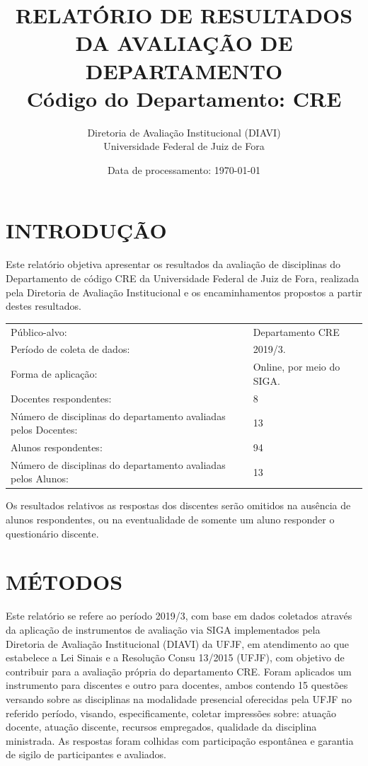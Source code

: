 \documentclass[a4paper,10pt]{article}
\date{Data de processamento: \today}
\begin{document}
\author{Diretoria de Avaliação Institucional (DIAVI) \\ Universidade Federal de Juiz de Fora}

\title{RELATÓRIO DE RESULTADOS DA AVALIAÇÃO DE DEPARTAMENTO\\ Código do Departamento: CRE}
\maketitle
\section{INTRODUÇÃO}
Este relatório objetiva apresentar os resultados da avaliação de disciplinas do Departamento     de código CRE da Universidade Federal de Juiz de Fora, realizada pela     Diretoria de Avaliação Institucional e os encaminhamentos propostos a     partir destes resultados.

\begin{center}
\begin{tabularx}{\linewidth}{X|l}

Público-alvo:& Departamento  CRE\\

Período de coleta de dados:& 2019/3.\\

Forma de aplicação:& Online, por meio do SIGA.\\

Docentes respondentes:& 8\\

Número de disciplinas do departamento avaliadas pelos Docentes:& 13\\

Alunos   respondentes:& 94\\

Número de disciplinas do departamento  avaliadas pelos   Alunos:& 13\\
\end{tabularx}
\end{center}

Os resultados relativos as respostas dos discentes serão omitidos na ausência de alunos respondentes, ou na eventualidade de somente um aluno responder o questionário discente.
\section{MÉTODOS}
Este relatório se refere ao período 2019/3, com base em dados     coletados através da aplicação de instrumentos de avaliação via SIGA     implementados pela Diretoria de Avaliação Institucional (DIAVI) da UFJF, em atendimento     ao que estabelece a Lei Sinais e a Resolução Consu 13/2015 (UFJF),     com objetivo de contribuir para a avaliação própria do departamento CRE.    Foram aplicados um instrumento para discentes e outro para docentes, ambos contendo     15 questões versando sobre as disciplinas na modalidade presencial oferecidas pela UFJF no     referido período, visando, especificamente, coletar impressões sobre: atuação docente, atuação discente,     recursos empregados, qualidade da disciplina ministrada.     As respostas foram colhidas      com participação espontânea e garantia de    sigilo de participantes e avaliados.
\end{document}

